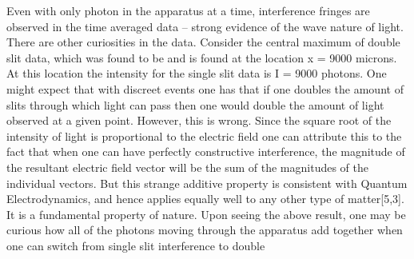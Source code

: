 \documentclass[12pt,twocolumn]{article}
\begin{document}
Even with only photon in the apparatus at a time, interference fringes are  observed in the time averaged data – strong evidence of the wave nature of light. There are other curiosities in the data. Consider the central maximum of double slit data, which was found to be and is found at the location x = 9000 microns. At this location the intensity for the single slit data is I = 9000 photons. One might expect that with discreet events one has that if one doubles the amount of slits through which light can pass then one would double the amount of light observed at a given point. However, this is wrong.  Since the square root of the intensity of light is proportional to the electric field one can attribute this to the fact that when one can have perfectly constructive interference, the magnitude of the resultant electric field vector will be the sum of the magnitudes of the individual vectors.  But this strange additive property is consistent with Quantum Electrodynamics, and hence applies equally well to any other type of matter[5,3]. It is a fundamental property of nature. Upon seeing the above result, one may be curious how all of the photons moving through the apparatus add together when one can switch from single slit interference to double


\nocite{*}


\end{document}

